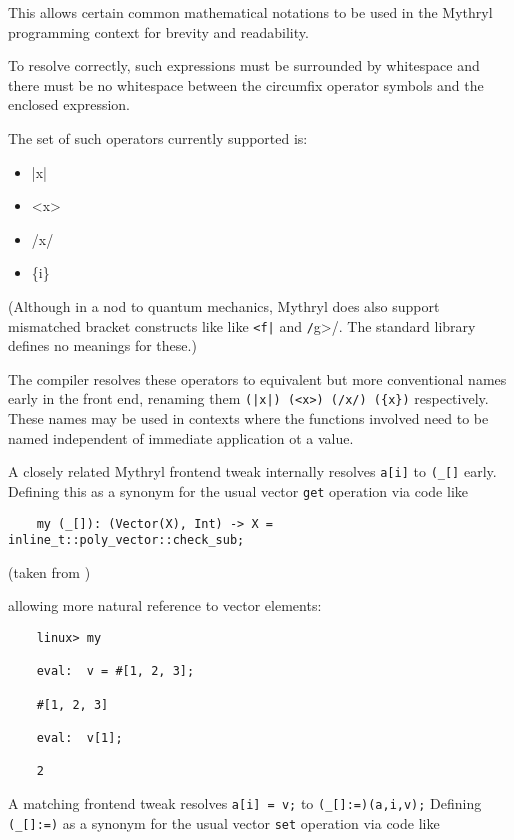 This allows certain common mathematical notations to be used in 
the Mythryl programming context for brevity and readability.

To resolve correctly, such expressions must be surrounded by whitespace 
and there must be no whitespace between the circumfix operator 
symbols and the enclosed expression.

The set of such operators currently supported is:

\begin{itemize}
\item |x|
\item <x>
\item /x/
\item \{i\}
\end{itemize}

(Although in a nod to quantum mechanics, Mythryl does also support mismatched bracket 
constructs like like \verb/<f|/ and \verb|/|g>/.  The standard library defines 
no meanings for these.)

The compiler resolves these operators to equivalent but more conventional 
names early in the front end, renaming them {\tt (|x|) (<x>) (/x/) (\{x\})} 
respectively.  These names may be used in contexts where the functions 
involved need to be named independent of immediate application ot a value.

A closely related Mythryl frontend tweak internally resolves {\tt a[i]} 
to {\tt (\_[]} early.  Defining this as a synonym for the usual vector 
{\tt get} operation via code like

\begin{verbatim}
    my (_[]): (Vector(X), Int) -> X = inline_t::poly_vector::check_sub;
\end{verbatim}

(taken from )

allowing more natural reference to vector elements:

\begin{verbatim}
    linux> my

    eval:  v = #[1, 2, 3];

    #[1, 2, 3]

    eval:  v[1];

    2
\end{verbatim}

A matching frontend tweak resolves {\tt a[i] = v;} 
to {\tt (\_[]:=)(a,i,v);}  Defining {\tt (\_[]:=)} as a synonym 
for the usual vector {\tt set} operation via code like

